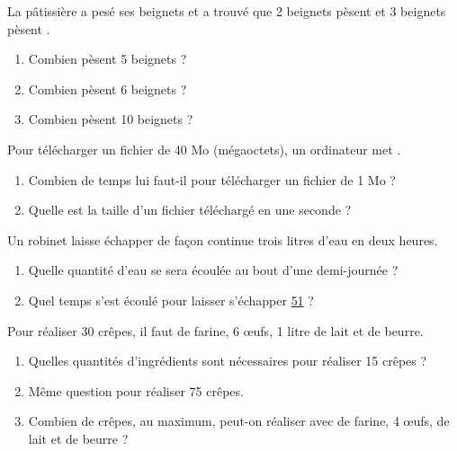 \begin{colonne*exercice}

\begin{exercice} %
   La pâtissière a pesé ses beignets et a trouvé que 2 beignets pèsent  et 3 beignets pèsent .
   \begin{enumerate}
      \item Combien pèsent 5 beignets ?
      \item Combien pèsent 6 beignets ?
      \item Combien pèsent 10 beignets ? 
   \end{enumerate}
\end{exercice}

\medskip

\begin{exercice} %
   Pour télécharger un fichier de 40 Mo (mégaoctets), un ordinateur met .
   \begin{enumerate}
      \item Combien de temps lui faut-il pour télécharger un fichier de 1 Mo ?
      \item Quelle est la taille d'un fichier téléchargé en une seconde ?
   \end{enumerate}
\end{exercice}

\medskip

\begin{exercice} %
   Un robinet laisse échapper de façon continue trois litres d’eau en deux heures.
   \begin{enumerate}
      \item Quelle quantité d’eau se sera écoulée au bout d’une demi-journée ?
      \item Quel temps s’est écoulé pour laisser s’échapper \ul{51} ?
   \end{enumerate}
\end{exercice}

\medskip

\begin{exercice} %
   Pour réaliser 30 crêpes, il faut  de farine, 6 œufs, 1 litre de lait et  de beurre.
   \begin{enumerate}
      \item Quelles quantités d'ingrédients sont nécessaires pour réaliser 15 crêpes ?
      \item Même question pour réaliser 75 crêpes.
      \item Combien de crêpes, au maximum, peut-on réaliser avec  de farine, 4 œufs,  de lait et  de beurre ?
   \end{enumerate}
\end{exercice}


\end{colonne*exercice}
